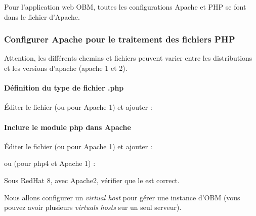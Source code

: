 Pour l'application web OBM, toutes les configurations Apache et PHP se
font dans le fichier  d'Apache.

\subsubsection*{Configurer Apache pour le traitement des fichiers PHP}

Attention, les différents chemins et fichiers peuvent varier entre les distributions et les versions d'apache (apache 1 et 2).

\paragraph{Définition du type de fichier .php}
Éditer le fichier  (ou  pour Apache 1) et
ajouter :


\paragraph{Inclure le module php dans Apache}
Éditer le fichier  (ou  pour Apache 1) et
ajouter :


ou (pour php4 et Apache 1) :


Sous RedHat 8, avec Apache2, vérifier que le
 est correct.

Nous allons  configurer un \emph{virtual host} pour gérer une instance
d'OBM (vous pouvez avoir plusieurs \emph{virtuals hosts} sur un seul
serveur). 

